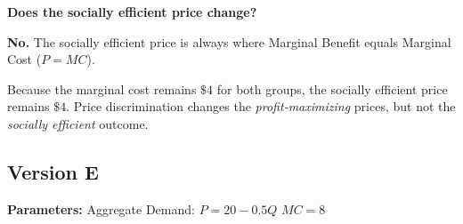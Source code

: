 \documentclass[12pt]{article}
\begin{document}
\begin{subqs}
\item \textbf{Does the socially efficient price change?}
  \begin{solbullets}
    \item \textbf{No.} The socially efficient price is always where Marginal Benefit equals Marginal Cost ($P = MC$).
    \item Because the marginal cost remains $\$4$ for both groups, the socially efficient price remains $\$4$. Price discrimination changes the \textit{profit-maximizing} prices, but not the \textit{socially efficient} outcome.
  \end{solbullets}

\end{subqs}

\newpage

\subsection*{Version E}

\textbf{Parameters:} Aggregate Demand: $P = 20 - 0.5Q$ \textbar{} $MC = 8$
\end{document}
